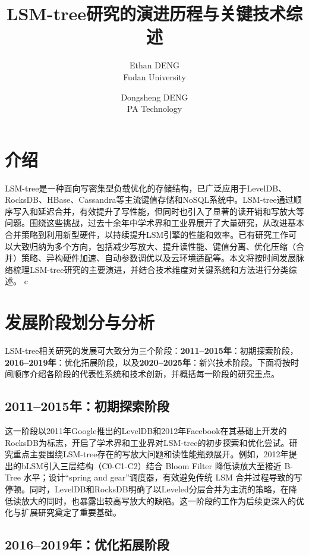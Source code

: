 \documentclass[lang=cn,11pt,a4paper]{elegantpaper}
\title{LSM-tree研究的演进历程与关键技术综述}
\author{Ethan DENG \\ Fudan University \and Dongsheng DENG \\ PA Technology}
\date{\zhtoday}
\begin{document}
\maketitle


\section{介绍}
LSM-tree是一种面向写密集型负载优化的存储结构，已广泛应用于LevelDB、RocksDB、HBase、Cassandra等主流键值存储和NoSQL系统中。LSM-tree通过顺序写入和延迟合并，有效提升了写性能，但同时也引入了显著的读开销和写放大等问题。围绕这些挑战，过去十余年中学术界和工业界展开了大量研究，从改进基本合并策略到利用新型硬件，以持续提升LSM引擎的性能和效率。已有研究工作可以大致归纳为多个方向，包括减少写放大、提升读性能、键值分离、优化压缩（合并）策略、异构硬件加速、自动参数调优以及云环境适配等。本文将按时间发展脉络梳理LSM-tree研究的主要演进，并结合技术维度对关键系统和方法进行分类综述。
c

\section{发展阶段划分与分析}


LSM-tree相关研究的发展可大致分为三个阶段：\textbf{2011–2015年}：初期探索阶段，\textbf{2016–2019年}：优化拓展阶段，以及\textbf{2020–2025年}：新兴技术阶段。下面将按时间顺序介绍各阶段的代表性系统和技术创新，并概括每一阶段的研究重点。


\subsection{2011–2015年：初期探索阶段}

这一阶段以2011年Google推出的LevelDB和2012年Facebook在其基础上开发的RocksDB为标志，开启了学术界和工业界对LSM-tree的初步探索和优化尝试。研究重点主要围绕LSM-tree存在的写放大问题和读性能瓶颈展开。例如，2012年提出的bLSM引入三层结构（C0-C1-C2）结合 Bloom Filter 降低读放大至接近 B-Tree 水平；设计“spring and gear”调度器，有效避免传统 LSM 合并过程导致的写停顿。同时，LevelDB和RocksDB明确了以Leveled分层合并为主流的策略，在降低读放大的同时，也暴露出较高写放大的缺陷。这一阶段的工作为后续更深入的优化与扩展研究奠定了重要基础。

\subsection{2016–2019年：优化拓展阶段}
\end{document}
